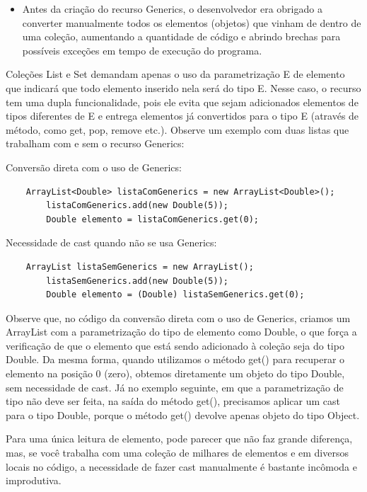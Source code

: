 \documentclass[11pt]{article}
\begin{document}
\begin{itemize}
\item Antes da criação do recurso Generics, o desenvolvedor era obrigado a converter manualmente todos os elementos (objetos) que vinham de dentro de uma coleção, aumentando a quantidade de código e abrindo brechas para possíveis exceções em tempo de execução do programa.
\end{itemize}

Coleções List e Set demandam apenas o uso da parametrização E de elemento que indicará que todo elemento inserido nela será do tipo E. Nesse caso, o recurso tem uma dupla funcionalidade, pois ele evita que sejam adicionados elementos de tipos diferentes de E e entrega elementos já convertidos para o tipo E (através de método, como get, pop, remove etc.). Observe um exemplo com duas listas que trabalham com e sem o recurso Generics:

Conversão direta com o uso de Generics:

\begin{verbatim}
    ArrayList<Double> listaComGenerics = new ArrayList<Double>();
        listaComGenerics.add(new Double(5));
        Double elemento = listaComGenerics.get(0);
\end{verbatim}

Necessidade de cast quando não se usa Generics:

\begin{verbatim}
    ArrayList listaSemGenerics = new ArrayList();
        listaSemGenerics.add(new Double(5));
        Double elemento = (Double) listaSemGenerics.get(0);
\end{verbatim}

Observe que, no código da conversão direta com o uso de Generics, criamos um ArrayList com a parametrização do tipo de elemento como Double, o que força a verificação de que o elemento que está sendo adicionado à coleção seja do tipo Double. Da mesma forma, quando utilizamos o método get() para recuperar o elemento na posição 0 (zero), obtemos diretamente um objeto do tipo Double, sem necessidade de cast. Já no exemplo seguinte, em que a parametrização de tipo não deve ser feita, na saída do método get(), precisamos aplicar um cast para o tipo Double, porque o método get() devolve apenas objeto do tipo Object.

Para uma única leitura de elemento, pode parecer que não faz grande diferença, mas, se você trabalha com uma coleção de milhares de elementos e em diversos locais no código, a necessidade de fazer cast manualmente é bastante incômoda e improdutiva.
\end{document}
